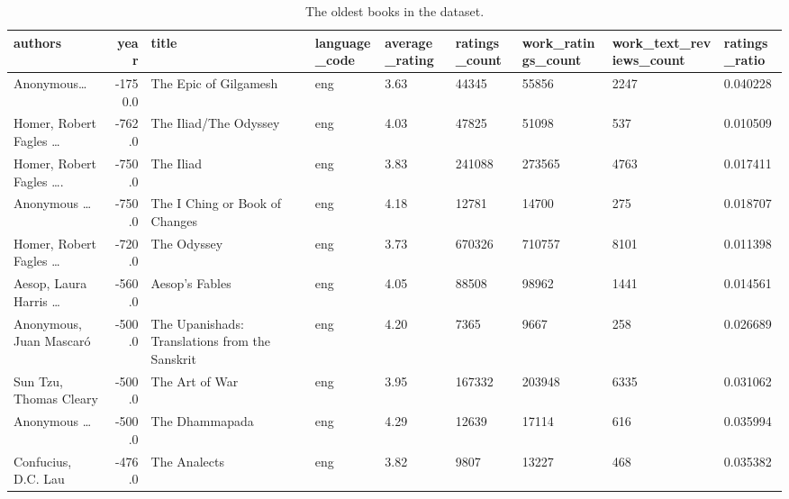 \documentclass[11pt]{article}
\begin{document}
\begin{table}
\begin{tabular}{lrlHHHHHZ}
\toprule
                                           authors &  year &                                           title & language\_code &  average\_rating &  ratings\_count &  work\_ratings\_count &  work\_text\_reviews\_count &  ratings\_ratio \\
\midrule
                           Anonymous\ldots &                    -1750.0 &                           The Epic of Gilgamesh &           eng &            3.63 &          44345 &               55856 &                     2247 &       0.040228 \\
                Homer, Robert Fagles \ldots &                     -762.0 &                           The Iliad/The Odyssey &           eng &            4.03 &          47825 &               51098 &                      537 &       0.010509 \\
 Homer, Robert Fagles \ldots. &                     -750.0 &                                       The Iliad &           eng &            3.83 &         241088 &              273565 &                     4763 &       0.017411 \\
 Anonymous \ldots &                     -750.0 &                  The I Ching or Book of Changes &           eng &            4.18 &          12781 &               14700 &                      275 &       0.018707 \\
 Homer, Robert Fagles  \ldots &                     -720.0 &                                     The Odyssey &           eng &            3.73 &         670326 &              710757 &                     8101 &       0.011398 \\
                  Aesop, Laura Harris \ldots &                     -560.0 &                                  Aesop's Fables &           eng &            4.05 &          88508 &               98962 &                     1441 &       0.014561 \\
                           Anonymous, Juan Mascar\'o &                     -500.0 &  The Upanishads: Translations from the Sanskrit &           eng &            4.20 &           7365 &                9667 &                      258 &       0.026689 \\
                            Sun Tzu, Thomas Cleary &                     -500.0 &                                  The Art of War &           eng &            3.95 &         167332 &              203948 &                     6335 &       0.031062 \\
 Anonymous \ldots &                     -500.0 &                                  The Dhammapada &           eng &            4.29 &          12639 &               17114 &                      616 &       0.035994 \\
                               Confucius, D.C. Lau &                     -476.0 &                                    The Analects &           eng &            3.82 &           9807 &               13227 &                      468 &       0.035382 \\
\bottomrule
\end{tabular}
    \caption[Oldest Books]{The oldest books in the dataset.}
     \label{tbl:oldest-books}
\end{table}
\end{document}
